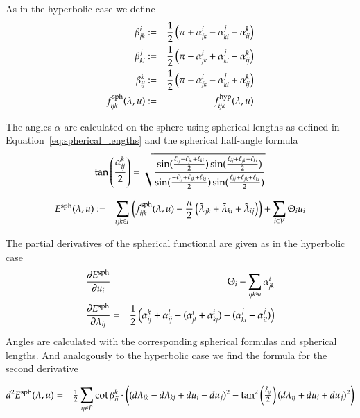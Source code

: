 \documentclass[Thesis]{subfiles}
\begin{document}
\begin{definition}
As in the hyperbolic case we define
\begin{eqnarray*}
	\beta_{\it jk}^i &:=& \frac{1}{2} \left(\pi + \alpha_{\it jk}^i - \alpha_{\it ki}^j - \alpha_{\it ij}^k \right)\\
	\beta_{\it ki}^j &:=& \frac{1}{2} \left(\pi - \alpha_{\it jk}^i + \alpha_{\it ki}^j - \alpha_{\it ij}^k \right)\\
	\beta_{\it ij}^k &:=& \frac{1}{2} \left(\pi - \alpha_{\it jk}^i - \alpha_{\it ki}^j + \alpha_{\it ij}^k \right)\\
	f^{\rm sph}_{\it ijk}(\lambda, u) &:=& f^{\rm hyp}_{\it ijk}(\lambda, u)
\end{eqnarray*}	
\end{definition}

The angles $\alpha$ are calculated on the sphere using spherical lengths as defined in 
Equation~\ref{eq:spherical_lengths} and the spherical half-angle formula
\[
  \tan\left(\frac{\alpha^k_{\it ij}}{2}\right)=
  \sqrt{\frac{
      \sin(\frac{\ell_{ij}-\ell_{jk}+\ell_{ki}}{2})
      \sin(\frac{\ell_{ij}+\ell_{jk}-\ell_{ki}}{2})
    }{
      \sin(\frac{-\ell_{ij}+\ell_{jk}+\ell_{ki}}{2})
      \sin(\frac{\ell_{ij}+\ell_{jk}+\ell_{ki}}{2})
    }}
\]

\begin{eqnarray}
	E^{\rm sph}(\lambda, u) &:=& \sum_{ijk\in F}\left(f_{\it ijk}^{\rm sph}(\lambda, u) - \frac{\pi}{2}\left(\tilde \lambda_{jk} + \tilde \lambda_{ki} + \tilde \lambda_{ij}\right)\right) + \sum_{i\in V} \Theta_i u_i
\end{eqnarray}

The partial derivatives of the spherical functional are given as in the hyperbolic case
\begin{eqnarray}
	\frac{\partial E^{\rm sph}}{\partial u_i} &=& \Theta_i - \sum_{\it ijk\ni i}\alpha^i_{\it jk} \\
	\frac{\partial E^{\rm sph}}{\partial \lambda_{\it ij}} &=& 
	\frac{1}{2}\left(\alpha_{\it ij}^k + \alpha_{\it ij}^l - (\alpha^i_{\it jl} + \alpha^i_{\it kj}) - (\alpha^j_{\it ki} + \alpha^j_{\it il})\right)
\end{eqnarray}
Angles are calculated with the corresponding spherical formulas and spherical lengths.
And analogously to the hyperbolic case we find the formula for the second derivative

\begin{eqnarray*}
d^2E^{\rm sph}(\lambda, u)
&=& \tfrac{1}{2}\sum_{\it ij\in \bar{E}} \cot\beta^k_{\it ij} \cdot 
 \left((d\lambda_{\it ik}-d\lambda_{\it kj} +  du_i-du_j)^2-\tan^2\left(\tfrac{\tilde \ell_{\it ij}}{2}\right)(d\lambda_{\it ij} +du_i+du_j)^2\right)
\end{eqnarray*}
\end{document}
